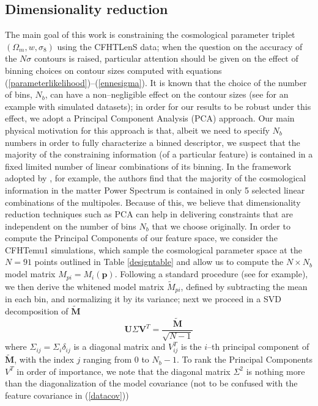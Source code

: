 \documentclass[reprint,aps,prd,superscriptaddress,showkeys,showpacs]{revtex4-1}
\begin{document}
\subsection{Dimensionality reduction}
\label{pcasection}
The main goal of this work is constraining the cosmological parameter triplet $(\Omega_m,w,\sigma_8)$ using the CFHTLenS data; when the question on the accuracy of the $N\sigma$ contours is raised, particular attention should be given on the effect of binning choices on contour sizes computed with equations (\ref{parameterlikelihood})--(\ref{ennesigma}). It is known that the choice of the number of bins, $N_b$, can have a non--negligible effect on the contour sizes (see \citep{Petri2013} for an example with simulated datasets); in order for our results to be robust under this effect, we adopt a Principal Component Analysis (PCA) approach. Our main physical motivation for this approach is that, albeit we need to specify $N_b$ numbers in order to fully characterize a binned descriptor, we suspect that the majority of the constraining information (of a particular feature) is contained in a fixed limited number of linear combinations of its binning.  In the framework adopted by \citep{coyote2}, for example, the authors find that the majority of the cosmological information in the matter Power Spectrum is contained in only 5 selected linear combinations of the multipoles. Because of this, we believe that dimensionality reduction techniques such as PCA can help in delivering constraints that are independent on the number of bins $N_b$ that we choose originally. In order to compute the Principal Components of our feature space, we consider the CFHTemu1 simulations, which sample the cosmological parameter space at the $N=91$ points outlined in Table \ref{designtable} and allow us to compute the $N\times N_b$ model matrix $M_{pi}=M_i(\mathbf{p})$. Following a standard procedure (see \citep{astroMLText} for example), we then derive the whitened model matrix $\tilde{M}_{pi}$, defined by subtracting the mean in each bin, and normalizing it by its variance; next we proceed in a SVD decomposition of $\mathbf{\tilde{M}}$
\begin{equation}
\label{svd}
\mathbf{U}\Sigma \mathbf{V}^T=\frac{\mathbf{\tilde{M}}}{\sqrt{N-1}}
\end{equation}   
%
where $\Sigma_{ij}=\Sigma_i\delta_{ij}$ is a diagonal matrix and $V^T_{ij}$ is the $i$--th principal component of $\mathbf{\tilde{M}}$, with the index $j$ ranging from $0$ to $N_b-1$. To rank the Principal Components $V^T$ in order of importance, we note that the diagonal matrix $\Sigma^2$ is nothing more than the diagonalization of the model covariance (not to be confused with the feature covariance in (\ref{datacov}))
\end{document}
